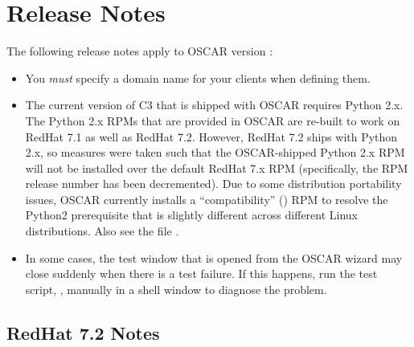 %
%
%

\section{Release Notes}
\label{sec:release-notes}

The following release notes apply to OSCAR version \oscarversion:

\begin{itemize}
\item You {\em must} specify a domain name for your clients when
  defining them.
  
\item The current version of C3 that is shipped with OSCAR requires
  Python 2.x.  The Python 2.x RPMs that are provided in OSCAR are
  re-built to work on RedHat 7.1 as well as RedHat 7.2.  However,
  RedHat 7.2 ships with Python 2.x, so measures were taken such that
  the OSCAR-shipped Python 2.x RPM will not be installed over the
  default RedHat 7.x RPM (specifically, the RPM release number has
  been decremented).  Due to some distribution portability issues,
  OSCAR currently installs a ``compatibility''
  () RPM to resolve the Python2
  prerequisite that is slightly different across different Linux
  distributions.  Also see the file
  .

\item In some cases, the test window that is opened from the 
  OSCAR wizard may close suddenly when there is a test failure. If
  this happens, run the test script, ,
  manually in a shell window to diagnose the problem.
\end{itemize}


\subsection{RedHat 7.2 Notes}
\label{subsec:rh72notes}

